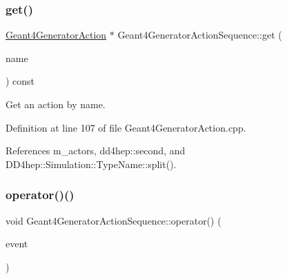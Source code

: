 \hypertarget{class_d_d4hep_1_1_simulation_1_1_geant4_generator_action_sequence_ae304cfc52197b4c0c95e38ffe072a801}{}\label{class_d_d4hep_1_1_simulation_1_1_geant4_generator_action_sequence_ae304cfc52197b4c0c95e38ffe072a801} 
\subsubsection{\texorpdfstring{get()}{get()}}
{\footnotesize\ttfamily \hyperlink{class_d_d4hep_1_1_simulation_1_1_geant4_generator_action}{Geant4\+Generator\+Action} $\ast$ Geant4\+Generator\+Action\+Sequence\+::get (\begin{DoxyParamCaption}\item[{const std\+::string \&}]{name }\end{DoxyParamCaption}) const}



Get an action by name. 



Definition at line 107 of file Geant4\+Generator\+Action.\+cpp.



References m\+\_\+actors, dd4hep\+::second, and D\+D4hep\+::\+Simulation\+::\+Type\+Name\+::split().

\hypertarget{class_d_d4hep_1_1_simulation_1_1_geant4_generator_action_sequence_a60e6a124a4d378fbf6a980137f5290cf}{}\label{class_d_d4hep_1_1_simulation_1_1_geant4_generator_action_sequence_a60e6a124a4d378fbf6a980137f5290cf} 
\subsubsection{\texorpdfstring{operator()()}{operator()()}}
{\footnotesize\ttfamily void Geant4\+Generator\+Action\+Sequence\+::operator() (\begin{DoxyParamCaption}\item[{G4\+Event $\ast$}]{event }\end{DoxyParamCaption})\hspace{0.3cm}{\ttfamily [virtual]}}



